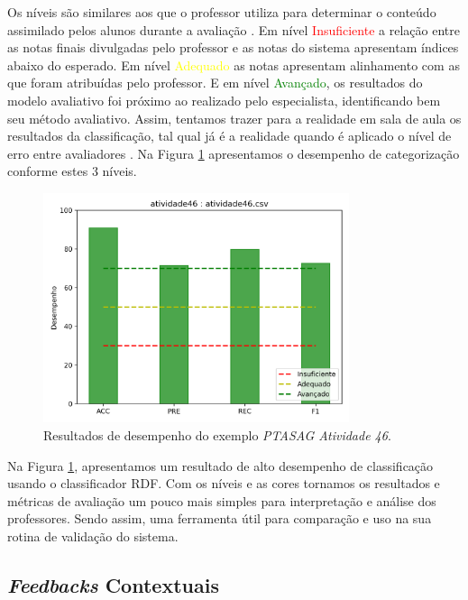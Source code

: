 Os níveis são similares aos que o professor utiliza para determinar o conteúdo assimilado pelos alunos durante a avaliação \cite{nascimento2020}. Em nível \textcolor{red}{Insuficiente} a relação entre as notas finais divulgadas pelo professor e as notas do sistema apresentam índices abaixo do esperado. Em nível \textcolor{yellow}{Adequado} as notas apresentam alinhamento com as que foram atribuídas pelo professor. E em nível \textcolor{green}{Avançado}, os resultados do modelo avaliativo foi próximo ao realizado pelo especialista, identificando bem seu método avaliativo. Assim, tentamos trazer para a realidade em sala de aula os resultados da classificação, tal qual já é a realidade quando é aplicado o nível de erro entre avaliadores \cite{almeida-junior2017}. Na Figura \ref{fig-ptasag-performance-46} apresentamos o desempenho de categorização conforme estes 3 níveis.

\begin{figure}[!t]
 \centering
 \includegraphics[width=0.8\textwidth]{figuras/exemplo/exemplo-ptasag-rdf.png}
 \caption{Resultados de desempenho do exemplo \textit{PTASAG Atividade 46}.}
 \label{fig-ptasag-performance-46}
\end{figure}

Na Figura \ref{fig-ptasag-performance-46}, apresentamos um resultado de alto desempenho de classificação usando o classificador RDF. Com os níveis e as cores tornamos os resultados e métricas de avaliação um pouco mais simples para interpretação e análise dos professores. Sendo assim, uma ferramenta útil para comparação e uso na sua rotina de validação do sistema.


\subsection{\textit{Feedbacks} Contextuais}
\label{subsec-feedbacks-contextuais}

